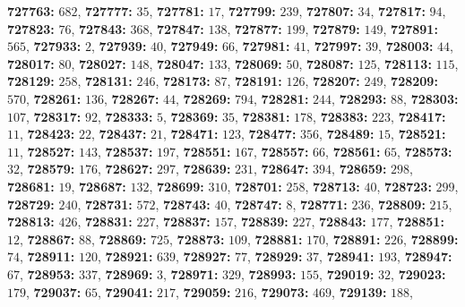 \textsf{\bfseries 727763:} $682$, \textsf{\bfseries 727777:} $35$, \textsf{\bfseries 727781:} $17$, \textsf{\bfseries 727799:} $239$, \textsf{\bfseries 727807:} $34$, \textsf{\bfseries 727817:} $94$, \textsf{\bfseries 727823:} $76$, \textsf{\bfseries 727843:} $368$, \textsf{\bfseries 727847:} $138$, \textsf{\bfseries 727877:} $199$, \textsf{\bfseries 727879:} $149$, \textsf{\bfseries 727891:} $565$, \textsf{\bfseries 727933:} $2$, \textsf{\bfseries 727939:} $40$, \textsf{\bfseries 727949:} $66$, \textsf{\bfseries 727981:} $41$, \textsf{\bfseries 727997:} $39$, \textsf{\bfseries 728003:} $44$, \textsf{\bfseries 728017:} $80$, \textsf{\bfseries 728027:} $148$, \textsf{\bfseries 728047:} $133$, \textsf{\bfseries 728069:} $50$, \textsf{\bfseries 728087:} $125$, \textsf{\bfseries 728113:} $115$, \textsf{\bfseries 728129:} $258$, \textsf{\bfseries 728131:} $246$, \textsf{\bfseries 728173:} $87$, \textsf{\bfseries 728191:} $126$, \textsf{\bfseries 728207:} $249$, \textsf{\bfseries 728209:} $570$, \textsf{\bfseries 728261:} $136$, \textsf{\bfseries 728267:} $44$, \textsf{\bfseries 728269:} $794$, \textsf{\bfseries 728281:} $244$, \textsf{\bfseries 728293:} $88$, \textsf{\bfseries 728303:} $107$, \textsf{\bfseries 728317:} $92$, \textsf{\bfseries 728333:} $5$, \textsf{\bfseries 728369:} $35$, \textsf{\bfseries 728381:} $178$, \textsf{\bfseries 728383:} $223$, \textsf{\bfseries 728417:} $11$, \textsf{\bfseries 728423:} $22$, \textsf{\bfseries 728437:} $21$, \textsf{\bfseries 728471:} $123$, \textsf{\bfseries 728477:} $356$, \textsf{\bfseries 728489:} $15$, \textsf{\bfseries 728521:} $11$, \textsf{\bfseries 728527:} $143$, \textsf{\bfseries 728537:} $197$, \textsf{\bfseries 728551:} $167$, \textsf{\bfseries 728557:} $66$, \textsf{\bfseries 728561:} $65$, \textsf{\bfseries 728573:} $32$, \textsf{\bfseries 728579:} $176$, \textsf{\bfseries 728627:} $297$, \textsf{\bfseries 728639:} $231$, \textsf{\bfseries 728647:} $394$, \textsf{\bfseries 728659:} $298$, \textsf{\bfseries 728681:} $19$, \textsf{\bfseries 728687:} $132$, \textsf{\bfseries 728699:} $310$, \textsf{\bfseries 728701:} $258$, \textsf{\bfseries 728713:} $40$, \textsf{\bfseries 728723:} $299$, \textsf{\bfseries 728729:} $240$, \textsf{\bfseries 728731:} $572$, \textsf{\bfseries 728743:} $40$, \textsf{\bfseries 728747:} $8$, \textsf{\bfseries 728771:} $236$, \textsf{\bfseries 728809:} $215$, \textsf{\bfseries 728813:} $426$, \textsf{\bfseries 728831:} $227$, \textsf{\bfseries 728837:} $157$, \textsf{\bfseries 728839:} $227$, \textsf{\bfseries 728843:} $177$, \textsf{\bfseries 728851:} $12$, \textsf{\bfseries 728867:} $88$, \textsf{\bfseries 728869:} $725$, \textsf{\bfseries 728873:} $109$, \textsf{\bfseries 728881:} $170$, \textsf{\bfseries 728891:} $226$, \textsf{\bfseries 728899:} $74$, \textsf{\bfseries 728911:} $120$, \textsf{\bfseries 728921:} $639$, \textsf{\bfseries 728927:} $77$, \textsf{\bfseries 728929:} $37$, \textsf{\bfseries 728941:} $193$, \textsf{\bfseries 728947:} $67$, \textsf{\bfseries 728953:} $337$, \textsf{\bfseries 728969:} $3$, \textsf{\bfseries 728971:} $329$, \textsf{\bfseries 728993:} $155$, \textsf{\bfseries 729019:} $32$, \textsf{\bfseries 729023:} $179$, \textsf{\bfseries 729037:} $65$, \textsf{\bfseries 729041:} $217$, \textsf{\bfseries 729059:} $216$, \textsf{\bfseries 729073:} $469$, \textsf{\bfseries 729139:} $188$, 

